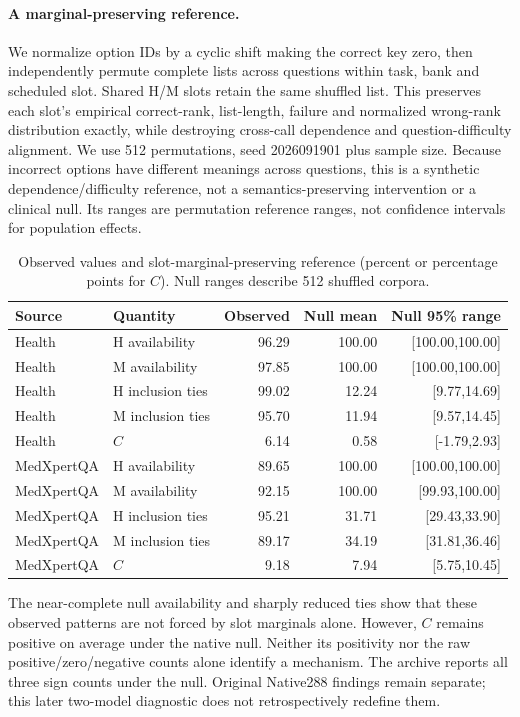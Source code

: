 \paragraph{A marginal-preserving reference.}
We normalize option IDs by a cyclic shift making the correct key zero, then independently permute complete lists across questions within task, bank and scheduled slot. Shared H/M slots retain the same shuffled list. This preserves each slot's empirical correct-rank, list-length, failure and normalized wrong-rank distribution exactly, while destroying cross-call dependence and question-difficulty alignment. We use 512 permutations, seed 2026091901 plus sample size. Because incorrect options have different meanings across questions, this is a synthetic dependence/difficulty reference, not a semantics-preserving intervention or a clinical null. Its ranges are permutation reference ranges, not confidence intervals for population effects.
\begin{table}[htbp]\centering\small
\caption{Observed values and slot-marginal-preserving reference (percent or percentage points for $C$). Null ranges describe 512 shuffled corpora.}
\label{tab:marginal_null}
\begin{tabular}{llrrr}
\toprule
Source & Quantity & Observed & Null mean & Null 95\% range\\
\midrule
Health & H availability & 96.29 & 100.00 & [100.00,100.00]\\
Health & M availability & 97.85 & 100.00 & [100.00,100.00]\\
Health & H inclusion ties & 99.02 & 12.24 & [9.77,14.69]\\
Health & M inclusion ties & 95.70 & 11.94 & [9.57,14.45]\\
Health & $C$ & 6.14 & 0.58 & [-1.79,2.93]\\
MedXpertQA & H availability & 89.65 & 100.00 & [100.00,100.00]\\
MedXpertQA & M availability & 92.15 & 100.00 & [99.93,100.00]\\
MedXpertQA & H inclusion ties & 95.21 & 31.71 & [29.43,33.90]\\
MedXpertQA & M inclusion ties & 89.17 & 34.19 & [31.81,36.46]\\
MedXpertQA & $C$ & 9.18 & 7.94 & [5.75,10.45]\\
\bottomrule
\end{tabular}
\end{table}

The near-complete null availability and sharply reduced ties show that these observed patterns are not forced by slot marginals alone. However, $C$ remains positive on average under the native null. Neither its positivity nor the raw positive/zero/negative counts alone identify a mechanism. The archive reports all three sign counts under the null. Original Native288 findings remain separate; this later two-model diagnostic does not retrospectively redefine them.

